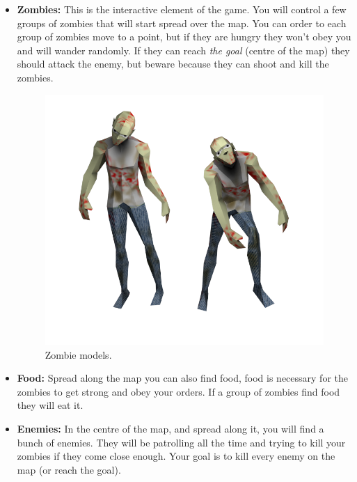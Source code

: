 \documentclass[a4paper,10pt]{article}
\begin{document}
    \begin{itemize}
     \item \textbf{Zombies:} This is the interactive element of the game. You will control a few groups of zombies that will start spread over the map. You can order to each group of zombies move to a point, but if they are hungry they won't obey you and will wander randomly. If they can reach \textit{the goal} (centre of the map) they should attack the enemy, but beware because they can shoot and kill the zombies.
  
	\begin{figure}[hbt]
	    \begin{center}
		\includegraphics[scale=.8]{zombies.png}
	    \end{center}
	    \caption{Zombie models.}
	    \label{fig:rb1}
	\end{figure}

     \item \textbf{Food:} Spread along the map you can also find food, food is necessary for the zombies to get strong and obey your orders. If a group of zombies find food they will eat it.

      \newpage
     \item \textbf{Enemies:} In the centre of the map, and spread along it, you will find a bunch of enemies. They will be patrolling all the time and trying to kill your zombies if they come close enough. Your goal is to kill every enemy on the map (or reach the goal).
  

\end{itemize}
\end{document}
